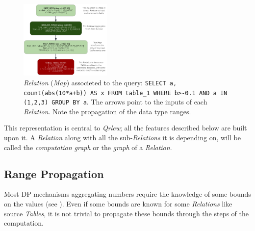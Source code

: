 \documentclass[letterpaper]{article} %
\newcommand{\qrlew}{\emph{Qrlew}}
\begin{document}
\begin{figure}[t]
    \centering
    \includegraphics[width=0.4\textwidth]{figures/relation}
    \caption{\emph{Relation} (\emph{Map}) associeted to the query: \texttt{SELECT a, count(abs(10*a+b)) AS x FROM table\_1 WHERE b>-0.1 AND a IN (1,2,3) GROUP BY a}. The arrows point to the inputs of each \emph{Relation}. Note the propagation of the data type ranges.}
    \label{process}
\end{figure}

This representation is central to \qrlew{}; all the features described below are built upon it. A \emph{Relation} along with all the  sub-\emph{Relations} it is depending on, will be called the \emph{computation graph} or the \emph{graph} of a \emph{Relation}.

\subsection{Range Propagation}

Most DP mechanisms aggregating numbers require the knowledge of some bounds on the values (see \cite{dwork2014algorithmic}).
Even if some bounds are known for some \emph{Relations} like source \emph{Tables}, it is not trivial to propagate these bounds through the steps of the computation.
\end{document}
